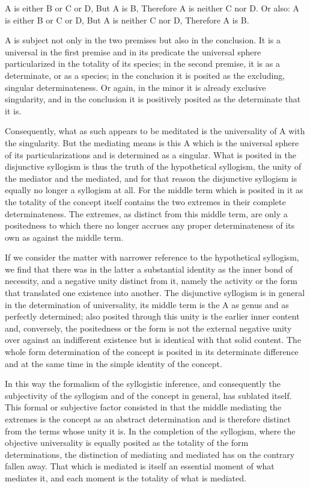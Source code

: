 A is either B or C or D,
But A is B,
Therefore A is neither C nor D.
Or also:
A is either B or C or D,
But A is neither C nor D,
Therefore A is B.

A is subject not only in the two premises
but also in the conclusion.
It is a universal in the first premise
and in its predicate the universal sphere
particularized in the totality of its species;
in the second premise, it is as a determinate,
or as a species;
in the conclusion it is posited as the excluding,
singular determinateness.
Or again, in the minor it is already exclusive singularity,
and in the conclusion it is positively posited
as the determinate that it is.

Consequently, what as such appears to be meditated is
the universality of A with the singularity.
But the mediating means is this A
which is the universal sphere of its particularizations
and is determined as a singular.
What is posited in the disjunctive syllogism is thus
the truth of the hypothetical syllogism,
the unity of the mediator and the mediated,
and for that reason the disjunctive syllogism is
equally no longer a syllogism at all.
For the middle term which is posited in it
as the totality of the concept itself contains
the two extremes in their complete determinateness.
The extremes, as distinct from this middle term,
are only a positedness to which
there no longer accrues any proper determinateness
of its own as against the middle term.

If we consider the matter with narrower reference
to the hypothetical syllogism,
we find that there was in the latter
a substantial identity as the inner bond of necessity,
and a negative unity distinct from it,
namely the activity or the form
that translated one existence into another.
The disjunctive syllogism is in general
in the determination of universality,
its middle term is the A as genus and as perfectly determined;
also posited through this unity is the earlier inner content
and, conversely, the positedness
or the form is not the external negative unity
over against an indifferent existence
but is identical with that solid content.
The whole form determination of the concept is
posited in its determinate difference
and at the same time in the simple identity of the concept.

In this way the formalism of the syllogistic inference,
and consequently the subjectivity of the syllogism
and of the concept in general,
has sublated itself.
This formal or subjective factor consisted in that the middle
mediating the extremes is the concept as an abstract determination and is
therefore distinct from the terms whose unity it is.
In the completion of the syllogism,
where the objective universality is equally posited as the totality
of the form determinations,
the distinction of mediating and mediated has
on the contrary fallen away.
That which is mediated is itself an essential
moment of what mediates it,
and each moment is the totality of what is mediated.

